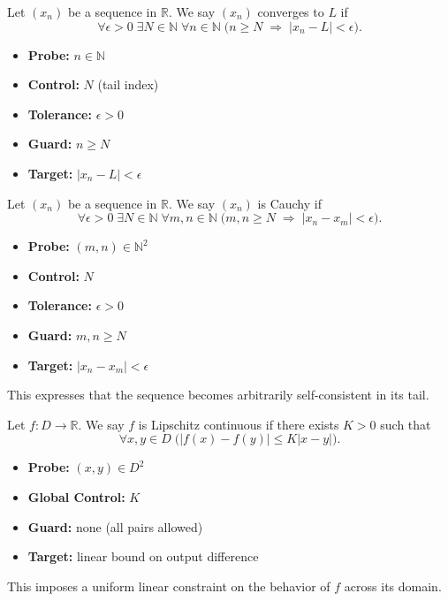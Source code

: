 \begin{definition}
Let $(x_n)$ be a sequence in $\mathbb{R}$. We say $(x_n)$ converges to $L$ if
\[
\forall \epsilon > 0\;\exists N \in \mathbb{N}\;\forall n \in \mathbb{N}\;
\Big(
n \geq N
\;\Rightarrow\;
|x_n - L| < \epsilon
\Big).
\]

\begin{itemize}
    \item \textbf{Probe:} $n \in \mathbb{N}$
    \item \textbf{Control:} $N$ (tail index)
    \item \textbf{Tolerance:} $\epsilon > 0$
    \item \textbf{Guard:} $n \geq N$
    \item \textbf{Target:} $|x_n - L| < \epsilon$
\end{itemize}
\end{definition}



\begin{definition}
Let $(x_n)$ be a sequence in $\mathbb{R}$. We say $(x_n)$ is Cauchy if
\[
\forall \epsilon > 0\;\exists N \in \mathbb{N}\;\forall m,n \in \mathbb{N}\;
\Big(
m,n \geq N
\;\Rightarrow\;
|x_n - x_m| < \epsilon
\Big).
\]

\begin{itemize}
    \item \textbf{Probe:} $(m,n) \in \mathbb{N}^2$
    \item \textbf{Control:} $N$
    \item \textbf{Tolerance:} $\epsilon > 0$
    \item \textbf{Guard:} $m,n \geq N$
    \item \textbf{Target:} $|x_n - x_m| < \epsilon$
\end{itemize}

This expresses that the sequence becomes arbitrarily self-consistent in its tail.
\end{definition}



\begin{definition}
Let $f : D \to \mathbb{R}$. We say $f$ is Lipschitz continuous if there exists $K > 0$ such that
\[
\forall x,y \in D\;
\big(
|f(x) - f(y)| \leq K |x - y|
\big).
\]

\begin{itemize}
    \item \textbf{Probe:} $(x,y) \in D^2$
    \item \textbf{Global Control:} $K$
    \item \textbf{Guard:} none (all pairs allowed)
    \item \textbf{Target:} linear bound on output difference
\end{itemize}

This imposes a uniform linear constraint on the behavior of $f$ across its domain.
\end{definition}




